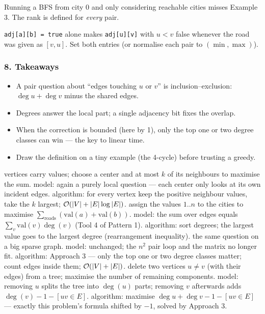 \begin{warningbox}
Running a BFS from city 0 and only considering reachable cities misses Example 3. The rank is defined for \emph{every} pair.
\end{warningbox}

\begin{warningbox}
\texttt{adj[a][b] = true} alone makes \texttt{adj[u][v]} with $u < v$ false whenever the road was given as $[v, u]$. Set both entries (or normalise each pair to $(\min, \max)$).
\end{warningbox}

\subsubsection*{8. Takeaways}

\begin{itemize}[leftmargin=*]
    \item A pair question about ``edges touching $u$ or $v$'' is inclusion--exclusion: $\deg u + \deg v$ minus the shared edges.
    \item Degrees answer the local part; a single adjacency bit fixes the overlap.
    \item When the correction is bounded (here by 1), only the top one or two degree classes can win --- the key to linear time.
    \item Draw the definition on a tiny example (the 4-cycle) before trusting a greedy.
\end{itemize}

\begin{variantsbox}
  {vertices carry values; choose a center and at most $k$ of its neighbours to maximise the sum.}
  {model: again a purely local question --- each center only looks at its own incident edges.}
  {algorithm: for every vertex keep the positive neighbour values, take the $k$ largest; $\mathcal{O}(|V|+|E|\log|E|)$.}
  {assign the values $1..n$ to the cities to maximise $\sum_{\text{roads}} (\text{val}(a)+\text{val}(b))$.}
  {model: the sum over edges equals $\sum_v \text{val}(v)\deg(v)$ (Tool 4 of Pattern 1).}
  {algorithm: sort degrees; the largest value goes to the largest degree (rearrangement inequality).}
  {the same question on a big sparse graph.}
  {model: unchanged; the $n^2$ pair loop and the matrix no longer fit.}
  {algorithm: Approach 3 --- only the top one or two degree classes matter; count edges inside them; $\mathcal{O}(|V|+|E|)$.}
  {delete two vertices $u \ne v$ (with their edges) from a tree; maximise the number of remaining components.}
  {model: removing $u$ splits the tree into $\deg(u)$ parts; removing $v$ afterwards adds $\deg(v) - 1 - [uv \in E]$.}
  {algorithm: maximise $\deg u + \deg v - 1 - [uv \in E]$ --- exactly this problem's formula shifted by $-1$, solved by Approach 3.}
\end{variantsbox}
